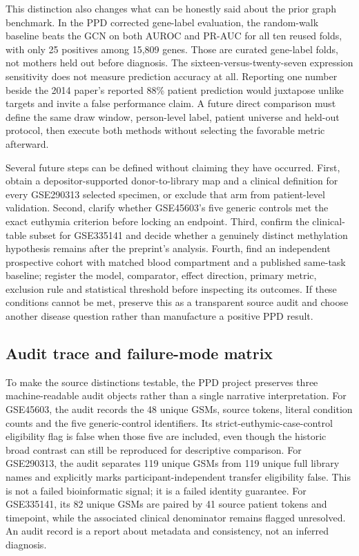 \documentclass[11pt,a4paper]{article}
\begin{document}
This distinction also changes what can be honestly said about the prior graph benchmark. In the PPD corrected gene-label evaluation, the random-walk baseline beats the GCN on both AUROC and PR-AUC for all ten reused folds, with only 25 positives among 15,809 genes. Those are curated gene-label folds, not mothers held out before diagnosis. The sixteen-versus-twenty-seven expression sensitivity does not measure prediction accuracy at all. Reporting one number beside the 2014 paper's reported 88\% patient prediction would juxtapose unlike targets and invite a false performance claim. A future direct comparison must define the same draw window, person-level label, patient universe and held-out protocol, then execute both methods without selecting the favorable metric afterward.

Several future steps can be defined without claiming they have occurred. First, obtain a depositor-supported donor-to-library map and a clinical definition for every GSE290313 selected specimen, or exclude that arm from patient-level validation. Second, clarify whether GSE45603's five generic controls met the exact euthymia criterion before locking an endpoint. Third, confirm the clinical-table subset for GSE335141 and decide whether a genuinely distinct methylation hypothesis remains after the preprint's analysis. Fourth, find an independent prospective cohort with matched blood compartment and a published same-task baseline; register the model, comparator, effect direction, primary metric, exclusion rule and statistical threshold before inspecting its outcomes. If these conditions cannot be met, preserve this as a transparent source audit and choose another disease question rather than manufacture a positive PPD result.


\subsection{Audit trace and failure-mode matrix}
To make the source distinctions testable, the PPD project preserves three machine-readable audit objects rather than a single narrative interpretation. For GSE45603, the audit records the 48 unique GSMs, source tokens, literal condition counts and the five generic-control identifiers. Its strict-euthymic-case-control eligibility flag is false when those five are included, even though the historic broad contrast can still be reproduced for descriptive comparison. For GSE290313, the audit separates 119 unique GSMs from 119 unique full library names and explicitly marks participant-independent transfer eligibility false. This is not a failed bioinformatic signal; it is a failed identity guarantee. For GSE335141, its 82 unique GSMs are paired by 41 source patient tokens and timepoint, while the associated clinical denominator remains flagged unresolved. An audit record is a report about metadata and consistency, not an inferred diagnosis.
\end{document}
